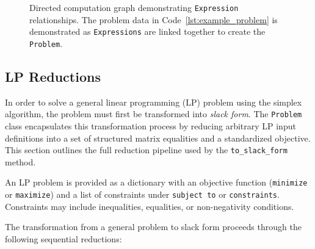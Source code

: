 \documentclass[conference]{IEEEtran}
\begin{document}
\begin{figure}[htbp]
    \caption{Directed computation graph demonstrating \texttt{Expression} relationships. The problem data in Code~\ref{lst:example_problem} is demonstrated as \texttt{Expressions} are linked together to create the \texttt{Problem}.}
    \label{fig:opt_problem}
\end{figure}


\subsection{LP Reductions}
\label{Reductions}
In order to solve a general linear programming (LP) problem using the simplex algorithm, the problem must first be transformed into \emph{slack form}. 
The \texttt{Problem} class encapsulates this transformation process by reducing arbitrary LP input definitions into a set of structured matrix equalities and a standardized objective. 
This section outlines the full reduction pipeline used by the \texttt{to\_slack\_form} method.

An LP problem is provided as a dictionary with an objective function (\texttt{minimize} or \texttt{maximize}) and a list of constraints under \texttt{subject to} or \texttt{constraints}. 
Constraints may include inequalities, equalities, or non-negativity conditions.

The transformation from a general problem to slack form proceeds through the following sequential reductions:
\end{document}
